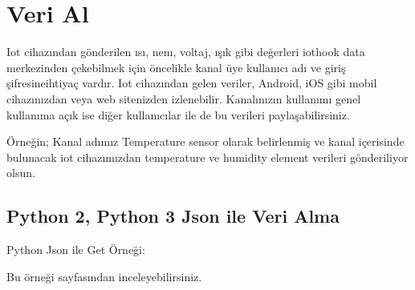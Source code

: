 \documentclass[letterpaper,10pt,turkish]{sphinxmanual}
\begin{document}
\section{Veri Al}
\label{\detokenize{read-data::doc}}\label{\detokenize{read-data:veri-al}}\label{\detokenize{read-data:read-data}}
Iot cihazından gönderilen ısı, nem, voltaj, ışık gibi değerleri iothook data
merkezinden çekebilmek için öncelikle kanal üye kullanıcı adı ve giriş şifresineihtiyaç vardır. Iot cihazından gelen veriler, Android, iOS gibi mobil cihazınızdan
veya web sitenizden izlenebilir. Kanalınızın kullanımı genel kullanıma açık ise diğer kullanıcılar
ile de bu verileri paylaşabilirsiniz.

Örneğin; Kanal adımız \sphinxquotedblleft{}Temperature sensor\sphinxquotedblright{} olarak belirlenmiş ve kanal içerisinde bulunacak
iot cihazımızdan \sphinxquotedblleft{}temperature\sphinxquotedblright{} ve \sphinxquotedblleft{}humidity\sphinxquotedblright{} element verileri gönderiliyor olsun.


\subsection{Python 2, Python 3 Json ile Veri Alma}
\label{\detokenize{read-data:python-2-python-3-json-ile-veri-alma}}
Python Json ile Get Örneği:

Bu örneği  sayfasından inceleyebilirsiniz.
\end{document}
